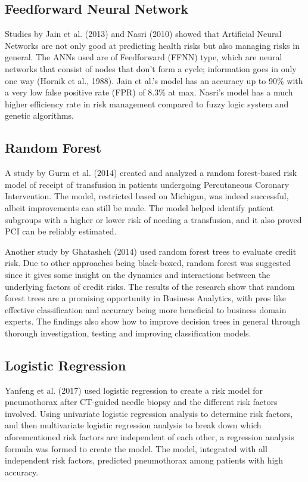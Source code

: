 ﻿\documentclass[10pt,11pt,12pt,oneside]{book}
\begin{document}
        \subsection{Feedforward Neural Network}
        Studies by Jain et al. (2013) and Nasri (2010) showed that Artificial Neural Networks are not only good at predicting health risks but also managing risks in general. The ANNs used are of Feedforward (FFNN) type, which are neural networks that consist of nodes that don’t form a cycle; information goes in only one way (Hornik et al., 1988). Jain et al.’s model has an accuracy up to 90\% with a very low false positive rate (FPR) of 8.3\% at max. Nasri’s model has a much higher efficiency rate in risk management compared to fuzzy logic system and genetic algorithms. \cite{jain_singh_2013, nasri2010application}

        \subsection{Random Forest}
        A study by Gurm et al. (2014) created and analyzed a random forest-based risk model of receipt of transfusion in patients undergoing Percutaneous Coronary Intervention. The model, restricted based on Michigan, was indeed successful, albeit improvements can still be made. The model helped identify patient subgroups with a higher or lower risk of needing a transfusion, and it also proved PCI can be reliably estimated. \cite{Gurm2014}

        Another study by Ghatasheh (2014) used random forest trees to evaluate credit risk. Due to other approaches being black-boxed, random forest was suggested since it gives some insight on the dynamics and interactions between the underlying factors of credit risks. The results of the research show that random forest trees are a promising opportunity in Business Analytics, with pros like effective classification and accuracy being more beneficial to business domain experts. The findings also show how to improve decision trees in general through thorough investigation, testing and improving classification models. \cite{Ghatasheh2014BusinessAU}
        \subsection{Logistic Regression}
        Yanfeng et al. (2017) used logistic regression to create a risk model for pneumothorax after CT-guided needle biopsy and the different risk factors involved. Using univariate logistic regression analysis to determine risk factors, and then multivariate logistic regression analysis to break down which aforementioned risk factors are independent of each other, a regression analysis formula was formed to create the model. The model, integrated with all independent risk factors, predicted pneumothorax among patients with high accuracy. \cite{Zhao2017}
\end{document}
